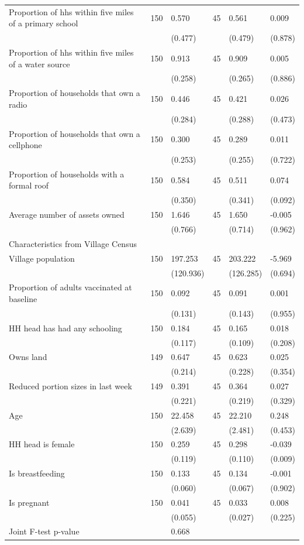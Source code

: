 \begin{tabular}{llllll}
Proportion of hhs within five miles of a primary school & 150 & 0.570 & 45 & 0.561 & 0.009\\
 &  & (0.477) &  & (0.479) & (0.878)\\
\addlinespace
Proportion of hhs within five miles of a water source & 150 & 0.913 & 45 & 0.909 & 0.005\\
 &  & (0.258) &  & (0.265) & (0.886)\\
Proportion of households that own a radio & 150 & 0.446 & 45 & 0.421 & 0.026\\
 &  & (0.284) &  & (0.288) & (0.473)\\
Proportion of households that own a cellphone & 150 & 0.300 & 45 & 0.289 & 0.011\\
\addlinespace
 &  & (0.253) &  & (0.255) & (0.722)\\
Proportion of households with a formal roof & 150 & 0.584 & 45 & 0.511 & 0.074\\
 &  & (0.350) &  & (0.341) & (0.092)\\
Average number of assets owned & 150 & 1.646 & 45 & 1.650 & -0.005\\
 &  & (0.766) &  & (0.714) & (0.962)\\
\addlinespace
Characteristics from Village Census &  &  &  &  & \\
Village population & 150 & 197.253 & 45 & 203.222 & -5.969\\
 &  & (120.936) &  & (126.285) & (0.694)\\
Proportion of adults vaccinated at baseline & 150 & 0.092 & 45 & 0.091 & 0.001\\
 &  & (0.131) &  & (0.143) & (0.955)\\
\addlinespace
HH head has had any schooling & 150 & 0.184 & 45 & 0.165 & 0.018\\
 &  & (0.117) &  & (0.109) & (0.208)\\
Owns land & 149 & 0.647 & 45 & 0.623 & 0.025\\
 &  & (0.214) &  & (0.228) & (0.354)\\
Reduced portion sizes in last week & 149 & 0.391 & 45 & 0.364 & 0.027\\
\addlinespace
 &  & (0.221) &  & (0.219) & (0.329)\\
Age & 150 & 22.458 & 45 & 22.210 & 0.248\\
 &  & (2.639) &  & (2.481) & (0.453)\\
HH head is female & 150 & 0.259 & 45 & 0.298 & -0.039\\
 &  & (0.119) &  & (0.110) & (0.009)\\
\addlinespace
Is breastfeeding & 150 & 0.133 & 45 & 0.134 & -0.001\\
 &  & (0.060) &  & (0.067) & (0.902)\\
Is pregnant & 150 & 0.041 & 45 & 0.033 & 0.008\\
 &  & (0.055) &  & (0.027) & (0.225)\\
Joint F-test p-value &  & 0.668 &  &  & \\
\bottomrule
\end{tabular}
